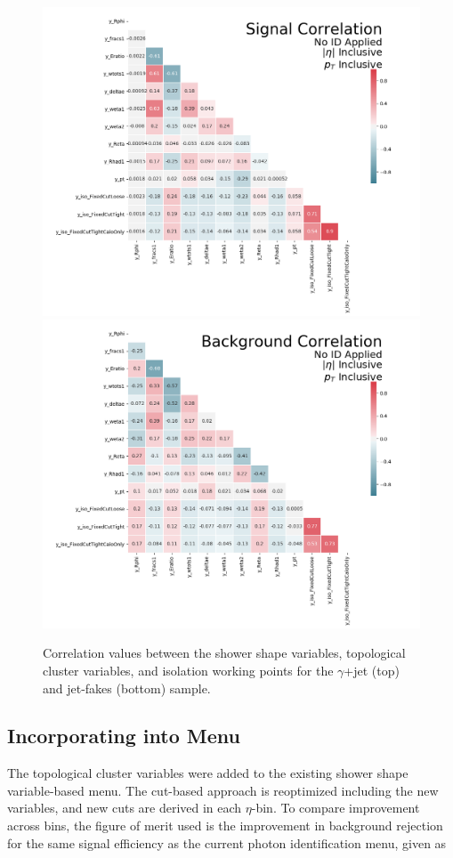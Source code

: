 \begin{figure}[!thp]
    \centering
    \includegraphics[width=.77\textwidth]{chapters/chapter4_photonID/images/sig_none_corr.png}
    \includegraphics[width=.77\textwidth]{chapters/chapter4_photonID/images/bkg_none_corr.png}
    \caption{Correlation values between the shower shape variables, topological cluster variables, and isolation working points for the $\gamma$+jet (top) and jet-fakes (bottom) sample.}
    \label{fig:photonid-corrs}
\end{figure}

\subsection{Incorporating into Menu}

The topological cluster variables were added to the existing shower shape variable-based menu. The cut-based approach is reoptimized including the new variables, and new cuts are derived in each $\eta$-\pt bin. To compare improvement across bins, the figure of merit used is the improvement in background rejection for the same signal efficiency as the current photon identification menu, given as

